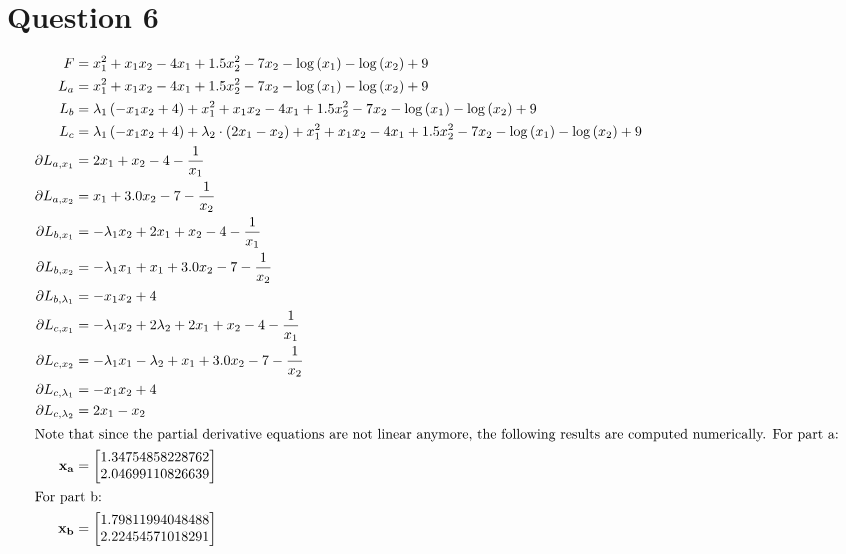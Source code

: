 \documentclass[a4paper,12pt]{article} %
\begin{document}
\section*{\textbf{Question 6}}
\begin{align*}
    F &= x_{1}^{2} + x_{1} x_{2} - 4 x_{1} + 1.5 x_{2}^{2} - 7 x_{2} - \log{\left(x_{1} \right)} - \log{\left(x_{2} \right)} + 9 \\
    L_a &= x_{1}^{2} + x_{1} x_{2} - 4 x_{1} + 1.5 x_{2}^{2} - 7 x_{2} - \log{\left(x_{1} \right)} - \log{\left(x_{2} \right)} + 9\\
    L_b &= \lambda_{1} \left(- x_{1} x_{2} + 4\right) + x_{1}^{2} + x_{1} x_{2} - 4 x_{1} + 1.5 x_{2}^{2} - 7 x_{2} - \log{\left(x_{1} \right)} - \log{\left(x_{2} \right)} + 9\\
    L_c &= \lambda_{1} \left(- x_{1} x_{2} + 4\right) + \lambda_{2} \cdot \left(2 x_{1} - x_{2}\right) + x_{1}^{2} + x_{1} x_{2} - 4 x_{1} + 1.5 x_{2}^{2} - 7 x_{2} - \log{\left(x_{1} \right)} - \log{\left(x_{2} \right)} + 9\\
    \partial L_{a,x_1} &= 2 x_{1} + x_{2} - 4 - \frac{1}{x_{1}}\\
    \partial L_{a,x_2} &= x_{1} + 3.0 x_{2} - 7 - \frac{1}{x_{2}}\\
    \partial L_{b,x_1} &= - \lambda_{1} x_{2} + 2 x_{1} + x_{2} - 4 - \frac{1}{x_{1}}\\
    \partial L_{b,x_2} &= - \lambda_{1} x_{1} + x_{1} + 3.0 x_{2} - 7 - \frac{1}{x_{2}}\\
    \partial L_{b,\lambda_1} &= - x_{1} x_{2} + 4\\
    \partial L_{c,x_1} &= - \lambda_{1} x_{2} + 2 \lambda_{2} + 2 x_{1} + x_{2} - 4 - \frac{1}{x_{1}}\\
    \partial L_{c,x_2} &= - \lambda_{1} x_{1} - \lambda_{2} + x_{1} + 3.0 x_{2} - 7 - \frac{1}{x_{2}}\\
    \partial L_{c,\lambda_1} &= - x_{1} x_{2} + 4\\
    \partial L_{c,\lambda_2} &= 2 x_{1} - x_{2}\\
    \intertext{Note that since the partial derivative equations are not linear anymore, the following results are 
    computed numerically.
    For part a:}
    \vect{x_a} &= \left[\begin{matrix}1.34754858228762\\2.04699110826639\end{matrix}\right] \\
    \intertext{For part b:}
    \vect{x_b} &= \left[\begin{matrix}1.79811994048488\\2.22454571018291\end{matrix}\right] \\

\end{align*}
\end{document}
